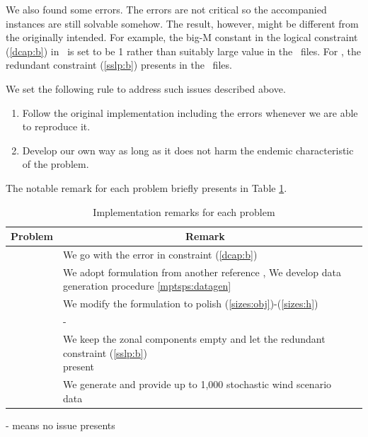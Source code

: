 We also found some errors. The errors are not critical so the accompanied instances are still solvable somehow. The result, however, might be different from the originally intended. For example, the big-M constant in the logical constraint (\ref{dcap:b}) in \dcap\ is set to be 1 rather than suitably large value in the \smps\ files. For \sslp, the redundant constraint (\ref{sslp:b}) presents in the \smps\ files. 

We set the following rule to address such issues described above.
\begin{enumerate}
	\item Follow the original implementation including the errors whenever we are able to reproduce it.
	\item Develop our own way as long as it does not harm the endemic characteristic of the problem.
\end{enumerate}

The notable remark for each problem briefly presents in Table \ref{table:remarks}.
\begin{table}[H]
	\centering
		\begin{threeparttable}
			\caption{Implementation remarks for each problem}
			\label{table:remarks}
			\begin{tabular}{@{}llp{3in}}
				\toprule
				Problem & \multicolumn{1}{c}{Remark}                                                \\ \midrule
				\dcap   & We go with the error in constraint (\ref{dcap:b})                                              \\
				\mptsps & \makecell[tl]{We adopt formulation from another reference \cite{journal:LSD1990}, We develop data \\generation procedure \ref{mptsps:datagen}} \\
				\sizes  & We modify the formulation to polish (\ref{sizes:obj})-(\ref{sizes:h})                                                    \\
				\smkp   & -                                                                         \\
				\sslp   & \makecell[tl]{We keep the zonal components empty and let the redundant constraint (\ref{sslp:b})\\ present }                                    \\
				\suc    & We generate and provide up to 1,000 stochastic wind scenario data                                    \\ \bottomrule
			\end{tabular}
			\begin{tablenotes}
				\small
				\item - means no issue presents
			\end{tablenotes}
		\end{threeparttable}
\end{table}

